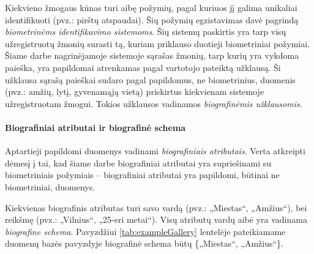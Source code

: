 

Kiekvieno žmogaus kūnas turi aibę požymių, pagal kuriuos jį galima unikaliai identifikuoti (pvz.: pirštų atspaudai).
Šių požymių egzistavimas davė pagrindą {\it biometrinėms identifikavimo sistemoms}.
Šių sistemų paskirtis yra tarp visų užregistruotų žmonių surasti tą, kuriam priklauso duotieji biometriniai požymiai.
Šiame darbe nagrinėjamoje sistemoje \cite{NeurotechnologyMegamatcherAccelerator} sąrašas žmonių, tarp kurių yra vykdoma paieška, yra papildomai atrenkamas pagal vartotojo pateiktą užklausą.
Ši užklausa sąrašą paieškai sudaro pagal papildomus, ne biometrinius, duomenis (pvz.: amžių, lytį, gyvenamąją vietą) priskirtus kiekvienam sistemoje užregistruotam žmogui.
Tokios užklausos vadinamos {\it biografinėmis užklausomis}.


\paragraph{Biografiniai atributai ir biografinė schema}

Aptartieji papildomi duomenys vadinami {\it biografiniais atributais}.
Verta atkreipti dėmesį į tai, kad šiame darbe biografiniai atributai yra supriešinami su biometriniais požymiais -- biografiniai atributai yra papildomi, būtinai ne biometriniai, duomenys.

Kiekvienas biografinis atributas turi savo vardą (pvz.: „Miestas“, „Amžius“), bei reikšmę (pvz.: „Vilnius“, „25-eri metai“).
Visų atributų vardų aibė yra vadinama {\it biografine schema}.
Pavyzdžiui \ref{tab:exampleGallery} lentelėje pateikiamame duomenų bazės pavyzdyje biografinė schema būtų \{„Miestas“, „Amžius“\}.

